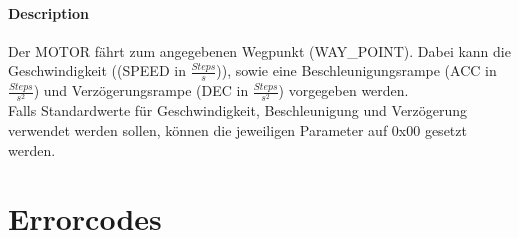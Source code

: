 \documentclass[10pt,a4paper]{article}
\begin{document}
\paragraph*{Description\\}
Der MOTOR fährt zum angegebenen Wegpunkt (WAY\_POINT). Dabei kann die Geschwindigkeit ((SPEED in $\frac{Steps}{s}$)), sowie eine Beschleunigungsrampe (ACC in $\frac{Steps}{s^2}$) und Verzögerungsrampe (DEC in $\frac{Steps}{s^2}$) vorgegeben werden.\\
Falls Standardwerte für Geschwindigkeit, Beschleunigung und Verzögerung verwendet werden sollen, können die jeweiligen Parameter auf 0x00 gesetzt werden.\\

\section{Errorcodes}
\end{document}
